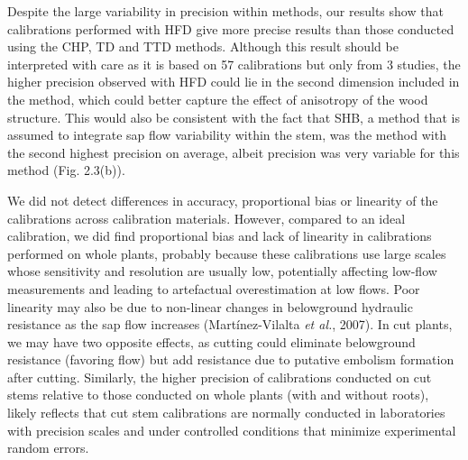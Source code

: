 \documentclass[11pt,twoside]{reedthesis}
\begin{document}
Despite the large variability in precision within methods, our results
show that calibrations performed with HFD give more precise results than
those conducted using the CHP, TD and TTD methods. Although this result
should be interpreted with care as it is based on 57 calibrations but
only from 3 studies, the higher precision observed with HFD could lie in
the second dimension included in the method, which could better capture
the effect of anisotropy of the wood structure. This would also be
consistent with the fact that SHB, a method that is assumed to integrate
sap flow variability within the stem, was the method with the second
highest precision on average, albeit precision was very variable for
this method (Fig. 2.3(b)).\par

We did not detect differences in accuracy, proportional bias or
linearity of the calibrations across calibration materials. However,
compared to an ideal calibration, we did find proportional bias and lack
of linearity in calibrations performed on whole plants, probably because
these calibrations use large scales whose sensitivity and resolution are
usually low, potentially affecting low-flow measurements and leading to
artefactual overestimation at low flows. Poor linearity may also be due
to non-linear changes in belowground hydraulic resistance as the sap
flow increases (Martínez-Vilalta \emph{et al.}, 2007). In cut plants, we
may have two opposite effects, as cutting could eliminate belowground
resistance (favoring flow) but add resistance due to putative embolism
formation after cutting. Similarly, the higher precision of calibrations
conducted on cut stems relative to those conducted on whole plants (with
and without roots), likely reflects that cut stem calibrations are
normally conducted in laboratories with precision scales and under
controlled conditions that minimize experimental random errors.\par
\end{document}
